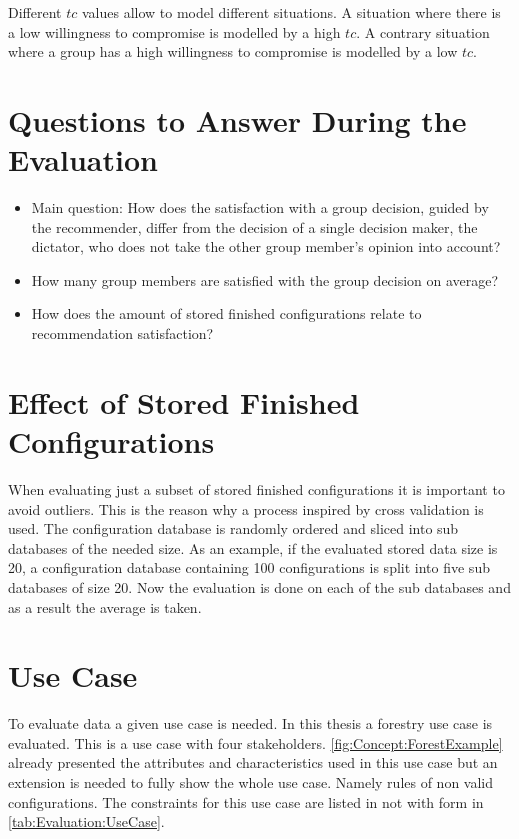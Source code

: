Different $tc$ values allow to model different situations. A situation where there is a low willingness to compromise is modelled by a high $tc$. A contrary situation where a group has a high willingness to compromise is modelled by a low $tc$.

\section{Questions to Answer During the Evaluation}
\label{sec:Evaluation:Questions}

\begin{itemize}
    \item Main question: How does the satisfaction with a group decision, guided by the recommender, differ from the decision of a single decision maker, the dictator, who does not take the other group member's opinion into account?
    \item How many group members are satisfied with the group decision on average?
    \item How does the amount of stored finished configurations relate to recommendation satisfaction?
\end{itemize}

\section{Effect of Stored Finished Configurations}
\label{sec:Evaluation:EffectFinishedConfiguration}

When evaluating just a subset of stored finished configurations it is important to avoid outliers. This is the reason why a process inspired by cross validation is used. The configuration database is randomly ordered and sliced into sub databases of the needed size. As an example, if the evaluated stored data size is 20, a configuration database containing 100 configurations is split into five sub databases of size 20. Now the evaluation is done on each of the sub databases and as a result the average is taken.

\section{Use Case}
\label{sec:Evaluation:UseCase}

To evaluate data a given use case is needed. In this thesis a forestry use case is evaluated. This is a use case with four stakeholders. \autoref{fig:Concept:ForestExample} already presented the attributes and characteristics used in this use case but an extension is needed to fully show the whole use case. Namely rules of non valid configurations. The constraints for this use case are listed in not with form in \autoref{tab:Evaluation:UseCase}. 

